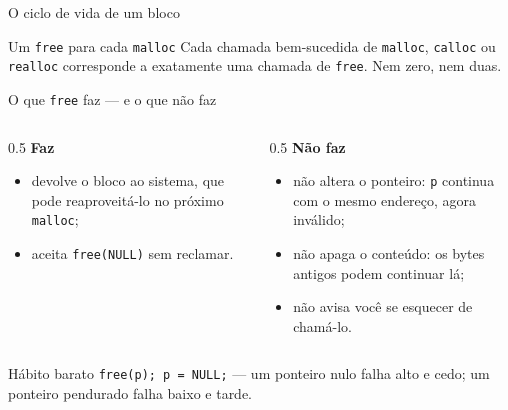 \documentclass[aspectratio=169]{beamer}
\begin{document}
\begin{frame}{O ciclo de vida de um bloco}
  \begin{center}
  \end{center}
  \begin{block}{Um \texttt{free} para cada \texttt{malloc}}
    Cada chamada bem-sucedida de \texttt{malloc}, \texttt{calloc} ou
    \texttt{realloc} corresponde a exatamente uma chamada de \texttt{free}.
    Nem zero, nem duas.
  \end{block}
\end{frame}

\begin{frame}{O que \texttt{free} faz --- e o que não faz}
  \begin{columns}[T]
    \begin{column}{0.5\textwidth}
      \textbf{Faz}
      \begin{itemize}
        \item devolve o bloco ao sistema, que pode reaproveitá-lo no próximo
          \texttt{malloc};
        \item aceita \texttt{free(NULL)} sem reclamar.
      \end{itemize}
    \end{column}
    \begin{column}{0.5\textwidth}
      \textbf{Não faz}
      \begin{itemize}
        \item não altera o ponteiro: \texttt{p} continua com o mesmo endereço,
          agora inválido;
        \item não apaga o conteúdo: os bytes antigos podem continuar lá;
        \item não avisa você se esquecer de chamá-lo.
      \end{itemize}
    \end{column}
  \end{columns}
  \begin{exampleblock}{Hábito barato}
    \texttt{free(p); p = NULL;} --- um ponteiro nulo falha alto e cedo;
    um ponteiro pendurado falha baixo e tarde.
  \end{exampleblock}
\end{frame}
\end{document}

